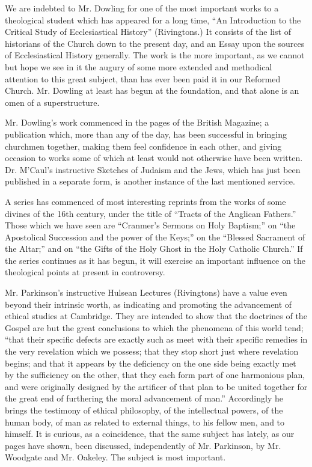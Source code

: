 We are indebted to Mr. Dowling for one of the most
important works to a theological student which has appeared for a long
time, ``An Introduction to the Critical Study of Ecclesiastical History''
(Rivingtons.) It consists of the list of historians of the Church down
to the present day, and an Essay upon the sources of Ecclesiastical
History generally. The work is the more important, as we cannot but hope
we see in it the augury of some more extended and methodical attention
to this great subject, than has ever been paid it in our Reformed
Church. Mr. Dowling at least has begun at the foundation, and that alone
is an omen of a superstructure.

Mr. Dowling's work commenced in the pages of the
British Magazine; a publication which, more than any of the day, has
been successful in bringing churchmen together, making them feel
confidence in each other, and giving occasion to works some of which at
least would not otherwise have been written. Dr. M'Caul's instructive
Sketches of Judaism and the Jews, which has just been published in a
separate form, is another instance of the last mentioned service.

A series has commenced of most interesting reprints
from the works of some divines of the 16th century, under the title of ``Tracts
of the Anglican Fathers.'' Those which we have seen are ``Cranmer's
Sermons on Holy Baptism;'' on ``the Apostolical Succession and the power
of the Keys;'' on the ``Blessed Sacrament of the Altar;'' and on ``the Gifts
of the Holy Ghost in the Holy Catholic Church.'' If the series continues
as it has begun, it will exercise an important influence on the
theological points at present in controversy.

Mr. Parkinson's instructive Hulsean Lectures
(Rivingtons) have a value even beyond their intrinsic worth, as
indicating and promoting the advancement of ethical studies at
Cambridge. They are intended to show that the doctrines of the Gospel
are but the great conclusions to which the phenomena of this world tend;
``that their specific defects are exactly such as meet with their
specific remedies in the very revelation which we possess; that they
stop short just where revelation begins; and that it appears by the
deficiency on the one side being exactly met by the sufficiency on the
other, that they each form part of one harmonious plan, and were
originally designed by the artificer of that plan to be united together
for the great end of furthering the moral advancement of man.''
Accordingly he brings the testimony of ethical philosophy, of the
intellectual powers, of the human body, of man as related to external
things, to his fellow men, and to himself. It is curious, as a
coincidence, that the same subject has lately, as our pages have shown,
been discussed, independently of Mr. Parkinson, by Mr. Woodgate and Mr.
Oakeley. The subject is most important.

